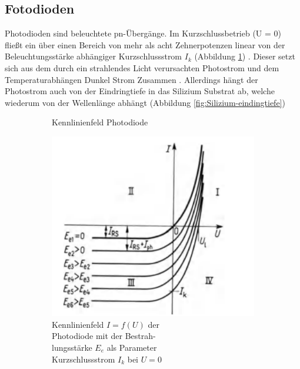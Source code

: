 
\subsection{Fotodioden}
Photodioden sind beleuchtete pn-Übergänge. Im Kurzschlussbetrieb (U = 0) fließt ein über einen Bereich von mehr als acht Zehnerpotenzen linear von der Beleuchtungsstärke abhängiger Kurzschlussstrom $I_k$ (Abbildung \ref{fig:PhotodiodeKennline})
\cite{Aktive_Bauelemente}.
Dieser setzt sich aus dem durch ein strahlendes Licht verursachten Photostrom und dem Temperaturabhängen Dunkel Strom Zusammen \cite{Halbleiterelektronik}.
Allerdings hängt der Photostrom auch von der Eindringtiefe in das Silizium Substrat ab, welche wiederum von der Wellenlänge abhängt (Abbildung  \ref{fig:Silizium-eindingtiefe}) \cite{osiopto_electronics}

\begin{figure}[H]
  \begin{subfigure}[b]{0.4\textwidth}
  \caption{Kennlinienfeld Photodiode}
    \includegraphics[width=\textwidth]{img/Photodiode-Kennline.png}
    \caption*{Kennlinienfeld $I=f(U)$ der \\Photodiode mit der Bestrah-\\lungsstärke $E_e$ als Parameter\\Kurzschlussstrom $I_k$ bei $U=0$}
    \label{fig:PhotodiodeKennline}
  \end{subfigure}
  \begin{subfigure}[b]{0.6\textwidth}

\end{subfigure}
\end{figure}
